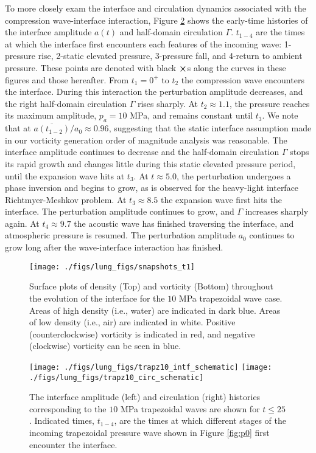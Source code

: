 To more closely exam the interface and circulation dynamics associated
with the compression wave-interface interaction, Figure
\ref{fig:trapz10_circ_interface} shows the early-time histories of the
interface amplitude $a(t)$ and half-domain circulation
$\Gamma$. $t_{1-4}$ are the times at which the interface first
encounters each features of the incoming wave: 1-pressure rise,
2-static elevated pressure, 3-pressure fall, and 4-return to ambient
pressure. These points are denoted with black $\boldsymbol{\times}$s along the
curves in these figures and those hereafter. From $t_1=0^+$ to $t_2$
the compression wave encounters the interface. During this interaction
the perturbation amplitude decreases, and the right half-domain
circulation $\Gamma$ rises sharply. At $t_2\approx1.1$, the pressure
reaches its maximum amplitude, $p_a=10$ MPa, and remains constant
until $t_3$. We note that at $\overline{a(t_{1-2})}/a_0\approx0.96$,
suggesting that the static interface assumption made in our vorticity
generation order of magnitude analysis was reasonable. The interface
amplitude continues to decrease and the half-domain circulation
$\Gamma$ stops its rapid growth and changes little during this static
elevated pressure period, until the expansion wave hits at $t_3$. At
$t\approx 5.0$, the perturbation undergoes a phase inversion and
begins to grow, as is observed for the heavy-light interface
Richtmyer-Meshkov problem. At $t_3\approx8.5$ the expansion wave first
hits the interface. The perturbation amplitude continues to grow, and
$\Gamma$ increases sharply again. At $t_4\approx9.7$ the acoustic wave
has finished traversing the interface, and atmospheric pressure is
resumed. The perturbation amplitude $a_0$ continues to grow long after
the wave-interface interaction has finished.
%
\begin{figure}[h] 
  \centering
\texttt{[image: ./figs/lung\_figs/snapshots\_t1]}
\caption[The evolution of the acoustically perturbed interface and vorticity field]{Surface plots of density (Top) and vorticity (Bottom)
  throughout the evolution of the interface for the $10$ MPa
  trapezoidal wave case. Areas of high density (i.e., water) are
indicated in dark blue. Areas of low density (i.e., air) are indicated
in white.  Positive (counterclockwise) vorticity is indicated in red,
and negative (clockwise) vorticity can be seen in blue.}
  \label{fig:interface_snapshots}
\end{figure}
%
\begin{figure}[h] 
  \centering
  \texttt{[image: ./figs/lung\_figs/trapz10\_intf\_schematic]}
  \texttt{[image: ./figs/lung\_figs/trapz10\_circ\_schematic]}
  \caption[The interface amplitude and circulation histories for the $10$ MPa trapezoidal wave]{The interface amplitude (left) and circulation (right)
    histories corresponding to the $10$ MPa trapezoidal waves are
    shown for $t\leq25$. Indicated times, $t_{1-4}$, are the times at
    which different stages of the incoming trapezoidal pressure wave
    shown in Figure \ref{fig:p0} first encounter the interface.}
  \label{fig:trapz10_circ_interface}
\end{figure}

